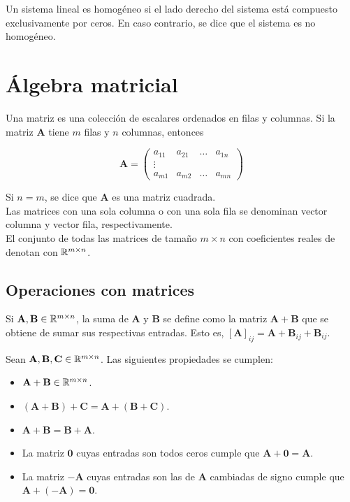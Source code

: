 \begin{defi}
Un sistema lineal es homogéneo si el lado derecho del sistema está compuesto exclusivamente por ceros. En caso contrario, se dice que el sistema es no homogéneo.
\end{defi}

\section{Álgebra matricial}

\begin{defi}
Una matriz es una colección de escalares ordenados en filas y columnas. Si la matriz $\mathbf{A}$ tiene $m$ filas y $n$ columnas, entonces

\[ \mathbf{A} = \left(\begin{array}{cccc}
a_{11} & a_{21} & \dots & a_{1n}\\
\vdots &        &       &       \\
a_{m1} & a_{m2} & \dots & a_{mn} 
\end{array}\right) \]

Si $n = m$, se dice que $\mathbf{A}$ es una matriz cuadrada.\\

Las matrices con una sola columna o con una sola fila se denominan vector columna y vector fila, respectivamente.\\

El conjunto de todas las matrices de tamaño $m \times n$ con coeficientes reales de denotan con $\mathbb{R}^{m\times n}$.
\end{defi}

\subsection*{Operaciones con matrices}

\begin{defi}
Si $\mathbf{A}, \mathbf{B} \in \mathbb{R}^{m \times n}$, la suma de $\mathbf{A}$ y $\mathbf{B}$ se define como la matriz $\mathbf{A} + \mathbf{B}$ que se obtiene de sumar sus respectivas entradas. Esto es, $[\mathbf{A}]_{ij} = \mathbf{A+ B}_{ij} + \mathbf{B}_{ij}$.
\end{defi}

\begin{prop}
Sean $\mathbf{A}, \mathbf{B}, \mathbf{C} \in \mathbb{R}^{m\times n}$. Las siguientes propiedades se cumplen:

\begin{itemize}
\item $\mathbf{A} + \mathbf{B} \in \mathbb{R}^{m \times n}$.
\item $(\mathbf{A} + \mathbf{B}) + \mathbf{C} = \mathbf{A} + (\mathbf{B} + \mathbf{C})$.
\item $\mathbf{A} + \mathbf{B} = \mathbf{B} + \mathbf{A}$.
\item La matriz $\mathbf{0}$ cuyas entradas son todos ceros cumple que $\mathbf{A} + \mathbf{0} = \mathbf{A}$.
\item La matriz $-\mathbf{A}$ cuyas entradas son las de $\mathbf{A}$ cambiadas de signo cumple que $\mathbf{A} + (-\mathbf{A}) = \mathbf{0}$.
\end{itemize}
\end{prop}

